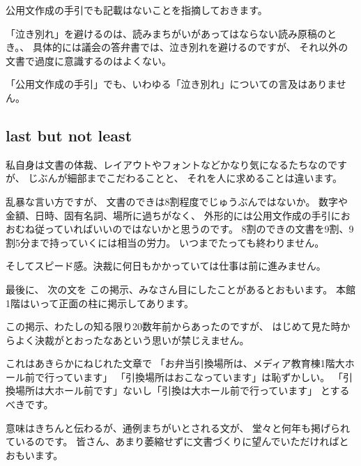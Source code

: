 \documentclass[uplatex,jis2004,dvipdfmx,12pt]{jsarticle}
\begin{document}
公用文作成の手引でも記載はないことを指摘しておきます。

「泣き別れ」を避けるのは、読みまちがいがあってはならない読み原稿のとき。、
具体的には議会の答弁書では、泣き別れを避けるのですが、
それ以外の文書で過度に意識するのはよくない。

「公用文作成の手引」でも、いわゆる「泣き別れ」についての言及はありません。
\fi


\subsection{last but not least}
私自身は文書の体裁、レイアウトやフォントなどかなり気になるたちなのですが、
じぶんが細部までこだわることと、
それを人に求めることは違います。

乱暴な言い方ですが、
文書のできは8割程度でじゅうぶんではないか。
数字や金額、日時、固有名詞、場所に過ちがなく、
外形的には公用文作成の手引におおむね従っていればいいのではないかと思うのです。
8割のできの文書を9割、9割5分まで持っていくには相当の労力。
いつまでたっても終わりません。


そしてスピード感。決裁に何日もかかっていては仕事は前に進みません。


最後に、
次の文を
この掲示、みなさん目にしたことがあるとおもいます。
本館1階はいって正面の柱に掲示してあります。

この掲示、わたしの知る限り20数年前からあったのですが、
はじめて見た時からよく決裁がとおったなあという思いが禁じえません。

これはあきらかにねじれた文章で
「お弁当引換場所は、メディア教育棟1階大ホール前で行っています」
「引換場所はおこなっています」は恥ずかしい。
「引換場所は大ホール前です」ないし「引換は大ホール前で行っています」
とするべきです。

意味はきちんと伝わるが、通例まちがいとされる文が、
堂々と何年も掲げられているのです。
皆さん、あまり萎縮せずに文書づくりに望んでいただければとおもいます。
\end{document}

